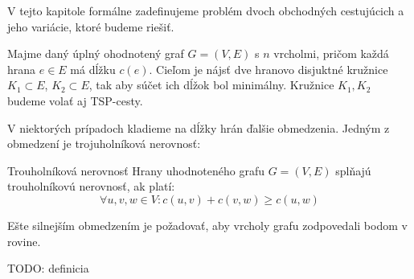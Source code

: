 V tejto kapitole formálne zadefinujeme problém dvoch obchodných cestujúcich
a jeho variácie, ktoré budeme riešiť.

\begin{definicia}
Majme daný úplný ohodnotený graf $G = (V, E)$ s $n$ vrcholmi, pričom každá hrana
$e \in E$ má dĺžku $c(e)$. Cieľom je nájsť dve hranovo disjuktné kružnice $K_1 \subset E$,
$K_2 \subset E$, tak aby súčet ich dĺžok bol minimálny. Kružnice $K_1, K_2$ budeme volať aj
TSP-cesty.
\end{definicia}

V niektorých prípadoch kladieme na dĺžky hrán ďalšie obmedzenia.
Jedným z obmedzení je trojuholníková nerovnosť:

\begin{definicia}{Trouholníková nerovnosť}
Hrany uhodnoteného grafu $G = (V, E)$ splňajú trouholníkovú nerovnosť, ak platí:
$$\forall u,v,w \in V: c(u,v) + c(v,w) \geq c(u,w)$$
\end{definicia}

Ešte silnejším obmedzením je požadovať, aby vrcholy grafu zodpovedali bodom v rovine.

TODO: definicia

